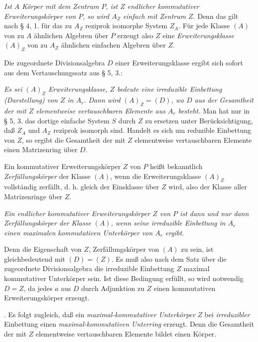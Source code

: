 \medskip
\noindent\textbf{} \emph{Ist \(A\) Körper mit dem Zentrum \(P\), ist \(Z\) endlicher kommutativer Erweiterungskörper von \(P\), so wird \(A_Z\) einfach mit Zentrum \(Z\).} Denn das gilt nach § 4, 1. für das zu \(A_Z\) reziprok isomorphe System \(Z_A\). Für jede Klasse \((A)\) von zu \(A\) ähnlichen Algebren über \(P\) erzeugt also \(Z\) eine \emph{Erweiterungsklasse} \((A)_Z\) von zu \(A_Z\) ähnlichen einfachen Algebren über \(Z\).

Die zugeordnete Divisionsalgebra \(D\) einer Erweiterungsklasse ergibt sich sofort aus dem Vertauschungssatz aus § 5, 3.:

\noindent\textbf{} \emph{Es sei \((A)_Z\) Erweiterungsklasse, \(Z\) bedeute eine irreduzible Einbettung (Darstellung) von \(Z\) in \(A_r\). Dann wird \((A)_Z=(D)\), wo \(D\) aus der Gesamtheit der mit \(Z\) elementweise vertauschbaren Elemente aus \(A_r\) besteht.} Man hat nur in § 5, 3. das dortige einfache System \(S\) durch \(Z\) zu ersetzen unter Berücksichtigung, daß \(Z_A\) und \(A_Z\) reziprok isomorph sind. Handelt es sich um reduzible Einbettung von \(Z\), so ergibt die Gesamtheit der mit \(Z\) elementweise vertauschbaren Elemente einen Matrizenring über \(D\).

Ein kommutativer Erweiterungskörper \(Z\) von \(P\) heißt bekanntlich \emph{Zerfällungskörper} der Klasse \((A)\), wenn die Erweiterungsklasse \((A)_Z\) vollständig zerfällt, d. h. gleich der Einsklasse über \(Z\) wird, also der Klasse aller Matrizenringe über \(Z\).

\noindent\textbf{}
\emph{Ein endlicher kommutativer Erweiterungskörper \(Z\) von \(P\) ist dann und nur dann Zerfällungskörper der Klasse \((A)\), wenn seine irreduzible Einbettung in \(A_r\) einen maximalen kommutativen Unterkörper von \(A_r\) ergibt.}

Denn die Eigenschaft von \(Z\), Zerfällungskörper von \((A)\) zu sein, ist gleichbedeutend mit \((D)=(Z)\). Es muß also nach dem Satz über die zugeordnete Divisionsalgebra die irreduzible Einbettung \(Z\) maximal kommutativer Unterkörper sein. Ist diese Bedingung erfüllt, so wird notwendig \(D=Z\), da jedes \(a\) aus \(D\) durch Adjunktion zu \(Z\) einen kommutativen Erweiterungskörper erzeugt.

\noindent\textbf{}. Es folgt zugleich, daß ein \emph{maximal-kommutativer Unterkörper} \(Z\) bei \emph{irreduzibler} Einbettung einen \emph{maximal-kommutativen Unterring} erzeugt. Denn die Gesamtheit der mit \(Z\) elementweise vertauschbaren Elemente bildet einen Körper.

